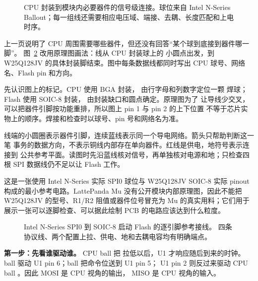 \begin{figure}
  \caption{CPU 封装到模块内必要器件的信号级连接。球位来自 Intel N-Series
  Ballout；每一组线还需要相应电压域、端接、去耦、长度匹配和上电时序。}
  \label{fig:carrier-cpu-local-wiring}
\end{figure}

%
上一页说明了 CPU 周围需要哪些器件，但还没有回答“某个球到底接到器件哪一脚”。
图~\ref{fig:carrier-cpu-spi-pin-to-pin} 改用原理图画法：线从 CPU 封装球上的
小圆点出发，到 W25Q128JV 的具体封装脚结束。图中每条数据线都同时写出
CPU 球号、网络名、Flash pin 和方向。

先认识图上的标记。CPU 使用 BGA 封装， 由行字母和列数字定位一颗
焊球；Flash 使用 SOIC-8 封装， 由封装缺口和圆点确定。原理图为了
让导线少交叉，可以把器件引脚按功能重排，所以图上 pin 1 与 pin 2 的上下位置
不等于芯片实物上的顺序。焊接和检查时以球号、pin 号和网络名为准。

线端的小圆圈表示器件引脚，连续蓝线表示同一个导电网络。箭头只帮助判断这一笔
事务的数据方向，不表示铜线内部存在单向器件。红线是供电，地符号表示连接到
公共参考平面。读图时先沿蓝线核对信号，再单独核对电源和地；只检查四根 SPI
数据线仍不足以让 Flash 工作。

这是一张使用 Intel N-Series 实际 SPI0 球位与 W25Q128JV SOIC-8 实际 pinout
构成的最小参考电路。LattePanda Mu 没有公开模块内部原理图，因此不能把
W25Q128JV 的型号、R1/R2 阻值或器件位号冒充为 Mu 的真实用料；它们用于
展示一张可以逐脚检查、可以据此绘制 PCB 的电路应该达到什么粒度。

\clearpage
\begin{figure}
  \centering
  
  \caption{Intel N-Series SPI0 到 SOIC-8 启动 Flash 的逐引脚参考接线。
  四条协议线、两个配置上拉、供电、地和去耦电容均有明确端点。}
  \label{fig:carrier-cpu-spi-pin-to-pin}
\end{figure}
\clearpage

\textbf{第一步：先看谁驱动谁。}
CPU ball  把  拉低以后，U1 才响应随后到来的时钟。
ball  驱动 U1 pin 6；ball  把命令位送到 U1 pin 5；
U1 pin 2 则反过来驱动 CPU ball 。因此 MOSI 是 CPU 视角的输出，
MISO 是 CPU 视角的输入。

